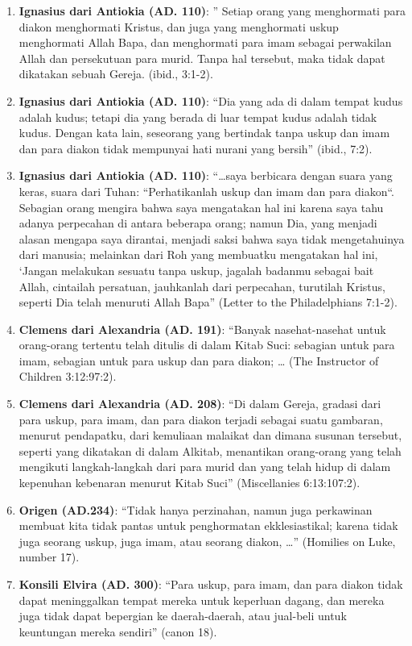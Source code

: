 \begin{enumerate}
\item \textbf{Ignasius dari Antiokia (AD. 110)}: ” Setiap orang yang menghormati para diakon menghormati Kristus, dan juga yang menghormati uskup menghormati Allah Bapa, dan menghormati para imam sebagai perwakilan Allah dan persekutuan para murid. Tanpa hal tersebut, maka tidak dapat dikatakan sebuah Gereja. (ibid., 3:1-2).
\item \textbf{Ignasius dari Antiokia (AD. 110)}: “Dia yang ada di dalam tempat kudus adalah kudus; tetapi dia yang berada di luar tempat kudus adalah tidak kudus. Dengan kata lain, seseorang yang bertindak tanpa uskup dan imam dan para diakon tidak mempunyai hati nurani yang bersih” (ibid., 7:2).
\item \textbf{Ignasius dari Antiokia (AD. 110)}: “…saya berbicara dengan suara yang keras, suara dari Tuhan: “Perhatikanlah uskup dan imam dan para diakon“. Sebagian orang mengira bahwa saya mengatakan hal ini karena saya tahu adanya perpecahan di antara beberapa orang; namun Dia, yang menjadi alasan mengapa saya dirantai, menjadi saksi bahwa saya tidak mengetahuinya dari manusia; melainkan dari Roh yang membuatku mengatakan hal ini, ‘Jangan melakukan sesuatu tanpa uskup, jagalah badanmu sebagai bait Allah, cintailah persatuan, jauhkanlah dari perpecahan, turutilah Kristus, seperti Dia telah menuruti Allah Bapa” (Letter to the Philadelphians 7:1-2).
\item \textbf{Clemens dari Alexandria (AD. 191)}: “Banyak nasehat-nasehat untuk orang-orang tertentu telah ditulis di dalam Kitab Suci: sebagian untuk para imam, sebagian untuk para uskup dan para diakon; … (The Instructor of Children 3:12:97:2).
\item \textbf{Clemens dari Alexandria (AD. 208)}: “Di dalam Gereja, gradasi dari para uskup, para imam, dan para diakon terjadi sebagai suatu gambaran, menurut pendapatku, dari kemuliaan malaikat dan dimana susunan tersebut, seperti yang dikatakan di dalam Alkitab, menantikan orang-orang yang telah mengikuti langkah-langkah dari para murid dan yang telah hidup di dalam kepenuhan kebenaran menurut Kitab Suci” (Miscellanies 6:13:107:2).
\item \textbf{Origen (AD.234)}: “Tidak hanya perzinahan, namun juga perkawinan membuat kita tidak pantas untuk penghormatan ekklesiastikal; karena tidak juga seorang uskup, juga imam, atau seorang diakon, …” (Homilies on Luke, number 17).
\item \textbf{Konsili Elvira (AD. 300)}: “Para uskup, para imam, dan para diakon tidak dapat meninggalkan tempat mereka untuk keperluan dagang, dan mereka juga tidak dapat bepergian ke daerah-daerah, atau jual-beli untuk keuntungan mereka sendiri” (canon 18).

\end{enumerate}
